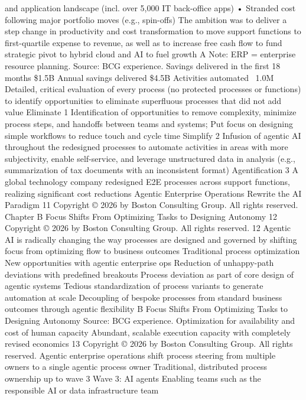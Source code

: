and application landscape (incl.
over 5,000 IT back-office apps)
• Stranded cost following major
portfolio moves (e.g., spin-offs)
The ambition was to deliver a step
change in productivity and cost
transformation to move support
functions to first-quartile expense
to revenue, as well as to increase
free cash flow to fund strategic
pivot to hybrid cloud and AI
to fuel growth
A
Note: ERP = enterprise resource planning. Source: BCG experience.
Savings delivered in
the first 18 months
\$1.5B
Annual savings
delivered
\$4.5B
Activities
automated
~1.0M
Detailed, critical evaluation of every process (no protected
processes or functions) to identify opportunities to eliminate
superfluous processes that did not add value
Eliminate
1
Identification of opportunities to remove complexity,
minimize process steps, and handoffs between teams and
systems; Put focus on designing simple workflows to reduce
touch and cycle time
Simplify
2
Infusion of agentic AI throughout the redesigned processes
to automate activities in areas with more subjectivity, enable
self-service, and leverage unstructured data in analysis  (e.g.,
summarization of tax documents with an inconsistent format)
Agentification
3
A global technology company redesigned E2E processes across support
functions, realizing significant cost reductions
Agentic Enterprise Operations Rewrite the AI Paradigm
11
Copyright © 2026 by Boston Consulting Group. All rights reserved.
Chapter B
Focus Shifts From Optimizing Tasks
to Designing Autonomy
12
Copyright © 2026 by Boston Consulting Group. All rights reserved.
12
Agentic AI is radically changing the way processes are designed and
governed by shifting focus from optimizing flow to business outcomes
Traditional process optimization
New opportunities with agentic enterprise ops
Reduction of unhappy-path deviations
with predefined breakouts
Process deviation as part of core design
of agentic systems
Tedious standardization of process
variants to generate automation at scale
Decoupling of bespoke processes from standard
business outcomes through agentic flexibility
B
Focus Shifts From Optimizing Tasks to Designing Autonomy
Source: BCG experience.
Optimization for availability and cost
of human capacity
Abundant, scalable execution capacity
with completely revised economics
13
Copyright © 2026 by Boston Consulting Group. All rights reserved.
Agentic enterprise operations shift process steering from multiple owners
to a single agentic process owner
Traditional, distributed process ownership up to wave 3
Wave 3: AI agents
Enabling teams such as the responsible
AI or data infrastructure team
